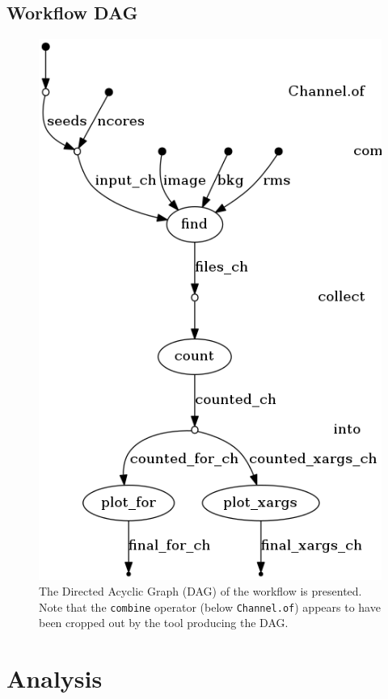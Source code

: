 \documentclass{article}
\begin{document}
\subsection{Workflow DAG}
\label{sec:workflow-dag}

\begin{figure}[h]
  \centering
  \includegraphics[scale = 0.4]{../nextflow/logs/final_dag.png}
  \caption[Workflow DAG]{
    The Directed Acyclic Graph (DAG) of the workflow is presented.
    Note that the \lstinline{combine} operator (below \lstinline{Channel.of})
    appears to have been cropped out by the tool producing the DAG.
  }
  \label{fig:workflow-dag}
\end{figure}

\clearpage

\section{Analysis}
\label{sec:analysis}
\end{document}
